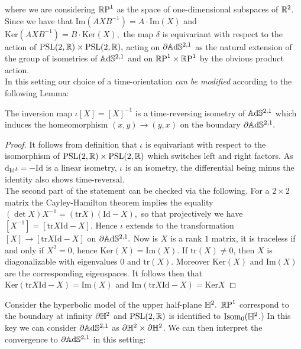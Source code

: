 where we are considering $\mathbb{R}\text{P}^1$ as the space of one-dimensional subspaces of $\mathbb{R}^2$. Since we have that $\text{Im}(AXB^{-1})=A\cdot\text{Im}(X)$ and $\text{Ker} (AXB^{-1})=B\cdot\text{Ker}(X),$ the map $\delta$ is equivariant with respect to the action of $\text{PSL}(2,\mathbb{R})\times\text{PSL}(2,\mathbb{R}),$ acting on $\partial\mathbb{A}\mathrm{d}\mathbb{S}^{2,1}$ as the natural extension of the group of isometries of $\mathbb{A}\mathrm{d}\mathbb{S}^{2,1}$ and on $\mathbb{R}\text{P}^1\times\mathbb{R}\text{P}^1$ by the obvious product action.\\
In this setting our choice of a time-orientation \textit{can be modified} according to the following Lemma:
\begin{lemma}\label{invertime}
    The inversion map $\iota[X]=[X]^{-1}$ is a time-reversing isometry of $\mathbb{A}\mathrm{d}\mathbb{S}^{2,1}$ which induces the homeomorphism $(x,y)\to(y,x)$ on the boundary $\partial\mathbb{A}\mathrm{d}\mathbb{S}^{2,1}.$
\end{lemma}
\begin{proof}
    It follows from definition that $\iota$ is equivariant with respect to the isomorphism of $\text{PSL}(2,\mathbb{R})\times\text{PSL}(2,\mathbb{R})$ which switches left and right factors. As $\text{d}_\text{Id}\iota=-\text{Id}$ is a linear isometry, $\iota$ is an isometry, the differential being minus the identity also shows time-reversal. \\
    The second part of the statement can be checked via the following. For a $2\times2$ matrix the Cayley-Hamilton theorem implies the equality $(\det X)X^{-1}=(\text{tr}X)(\text{Id}-X),$ so that projectively we have $[X^{-1}]=[\text{tr}X\text{Id}-X].$ Hence $\iota$ extends to the transformation $[X]\to[\text{tr}X\text{Id}-X]$ on $\partial\mathbb{A}\mathrm{d}\mathbb{S}^{2,1}.$ Now is $X$ is a rank $1$ matrix, it is traceless if and only if $X^2=0$, hence $\text{Ker}(X)=\text{Im}(X).$ If $\text{tr}(X)\neq 0$, then $X$ is diagonalizable with eigenvalues $0$ and $\text{tr}(X)$. Moreover $\text{Ker}(X)$ and $\text{Im}(X)$ are the corresponding eigenspaces. It follows then that $\text{Ker}(\text{tr}X\text{Id}-X)=\text{Im}(X)$ and $\text{Im}(\text{tr}X\text{Id}-X)=\text{Ker}X$ 
\end{proof}


Consider the hyperbolic model of the upper half-plane $\mathbb{H}^2.$ $\mathbb{R}\text{P}^1$ correspond to the boundary at infinity $\partial\mathbb{H}^2$ and $\text{PSL}(2,\mathbb{R})$ is identified to $\text{Isom}_0(\mathbb{H}^2$.) In this key we can consider $\partial\mathbb{A}\mathrm{d}\mathbb{S}^{2,1}$ as $\partial\mathbb{H}^2\times\partial\mathbb{H}^2$. We can then interpret the convergence to $\partial\mathbb{A}\mathrm{d}\mathbb{S}^{2,1}$ in this setting:

